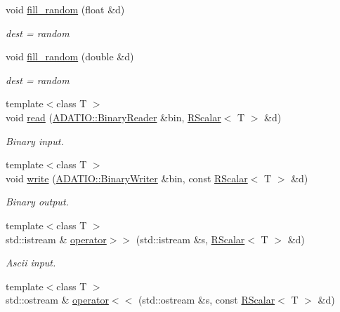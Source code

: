 \begin{DoxyCompactItemize}
\item 
void \mbox{\hyperlink{namespaceENSEM_a6b1e92930b4fcb2ce1fa31cfd98c3e15}{fill\+\_\+random}} (float \&d)
\begin{DoxyCompactList}\small\item\em dest = random \end{DoxyCompactList}\item 
void \mbox{\hyperlink{namespaceENSEM_a6ff7a31a0fb5d175a3065b60f365fa0d}{fill\+\_\+random}} (double \&d)
\begin{DoxyCompactList}\small\item\em dest = random \end{DoxyCompactList}\item 
{\footnotesize template$<$class T $>$ }\\void \mbox{\hyperlink{group__rscalar_gaccfe83f3d505a988121c117c9383f188}{read}} (\mbox{\hyperlink{classADATIO_1_1BinaryReader}{A\+D\+A\+T\+I\+O\+::\+Binary\+Reader}} \&bin, \mbox{\hyperlink{classENSEM_1_1RScalar}{R\+Scalar}}$<$ T $>$ \&d)
\begin{DoxyCompactList}\small\item\em Binary input. \end{DoxyCompactList}\item 
{\footnotesize template$<$class T $>$ }\\void \mbox{\hyperlink{group__rscalar_ga22fa002fd1c18dfe5d521aef45102477}{write}} (\mbox{\hyperlink{classADATIO_1_1BinaryWriter}{A\+D\+A\+T\+I\+O\+::\+Binary\+Writer}} \&bin, const \mbox{\hyperlink{classENSEM_1_1RScalar}{R\+Scalar}}$<$ T $>$ \&d)
\begin{DoxyCompactList}\small\item\em Binary output. \end{DoxyCompactList}\item 
{\footnotesize template$<$class T $>$ }\\std\+::istream \& \mbox{\hyperlink{group__rscalar_ga20742b8ba8dde3fd2bb81883ac983c5f}{operator$>$$>$}} (std\+::istream \&s, \mbox{\hyperlink{classENSEM_1_1RScalar}{R\+Scalar}}$<$ T $>$ \&d)
\begin{DoxyCompactList}\small\item\em Ascii input. \end{DoxyCompactList}\item 
{\footnotesize template$<$class T $>$ }\\std\+::ostream \& \mbox{\hyperlink{group__rscalar_ga362d60e2c1d2c88b747e44c6102f87db}{operator$<$$<$}} (std\+::ostream \&s, const \mbox{\hyperlink{classENSEM_1_1RScalar}{R\+Scalar}}$<$ T $>$ \&d)

\end{DoxyCompactItemize}
